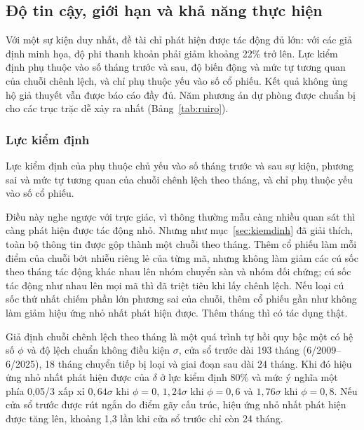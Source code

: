 \subsection{Độ tin cậy, giới hạn và khả năng thực hiện}\label{sec:tincay}

\begin{tomtat}
Với một sự kiện duy nhất, đề tài chỉ phát hiện được tác động đủ lớn: với các giả định minh họa, độ phi thanh khoản phải giảm khoảng 22\% trở lên. Lực kiểm định phụ thuộc vào số tháng trước và sau, độ biến động và mức tự tương quan của chuỗi chênh lệch, và chỉ phụ thuộc yếu vào số cổ phiếu. Kết quả không ủng hộ giả thuyết vẫn được báo cáo đầy đủ. Năm phương án dự phòng được chuẩn bị cho các trục trặc dễ xảy ra nhất (Bảng~\ref{tab:ruiro}).
\end{tomtat}

\subsubsection*{Lực kiểm định}

Lực kiểm định của  phụ thuộc chủ yếu vào số tháng trước và sau sự kiện, phương sai và mức tự tương quan của chuỗi chênh lệch theo tháng, và chỉ phụ thuộc yếu vào số cổ phiếu.

Điều này nghe ngược với trực giác, vì thông thường mẫu càng nhiều quan sát thì càng phát hiện được tác động nhỏ. Nhưng như mục~\ref{sec:kiemdinh} đã giải thích, toàn bộ thông tin được gộp thành một chuỗi theo tháng. Thêm cổ phiếu làm mỗi điểm của chuỗi bớt nhiễu riêng lẻ của từng mã, nhưng không làm giảm các cú sốc theo tháng tác động khác nhau lên nhóm chuyển sàn và nhóm đối chứng; cú sốc tác động như nhau lên mọi mã thì đã triệt tiêu khi lấy chênh lệch. Nếu loại cú sốc thứ nhất chiếm phần lớn phương sai của chuỗi, thêm cổ phiếu gần như không làm giảm hiệu ứng nhỏ nhất phát hiện được. Thêm tháng thì có tác dụng thật.

Giả định chuỗi chênh lệch theo tháng là một quá trình tự hồi quy bậc một có hệ số $\phi$ và độ lệch chuẩn không điều kiện $\sigma$, cửa sổ trước dài 193 tháng (6/2009--6/2025), 18 tháng chuyển tiếp bị loại và giai đoạn sau dài 24 tháng. Khi đó hiệu ứng nhỏ nhất phát hiện được của $\delta$ ở lực kiểm định 80\% và mức ý nghĩa một phía 0,05/3 xấp xỉ $0{,}64\sigma$ khi $\phi = 0$, $1{,}24\sigma$ khi $\phi = 0{,}6$ và $1{,}76\sigma$ khi $\phi = 0{,}8$. Nếu cửa sổ trước được rút ngắn do điểm gãy cấu trúc, hiệu ứng nhỏ nhất phát hiện được tăng lên, khoảng 1,3 lần khi cửa sổ trước chỉ còn 24 tháng.

